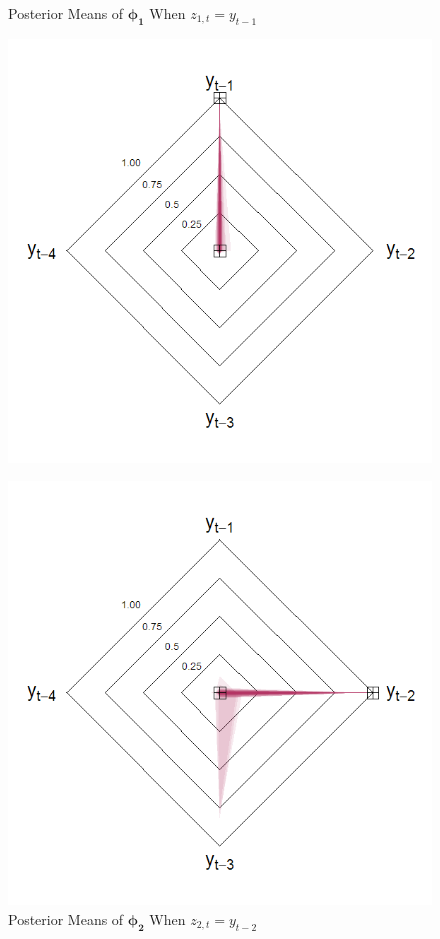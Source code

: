 \begin{figure}[!h]
\center
\begin{minipage}[h]{0.4\textwidth}
\caption{Posterior Means of $\bm{\phi_1}$ When $z_{1,t}=y_{t-1}$}
\label{fig:th1}
\includegraphics[scale=0.32]{hsthvar1}
\end{minipage} \hspace{0.1\textwidth}
\begin{minipage}[h]{0.4\textwidth}
\caption{Posterior Means of $\bm{\phi_2}$ When $z_{2,t}=y_{t-2}$}
\label{fig:th2}
\includegraphics[scale=0.32]{hsthvar2}

\end{minipage}
\end{figure}
